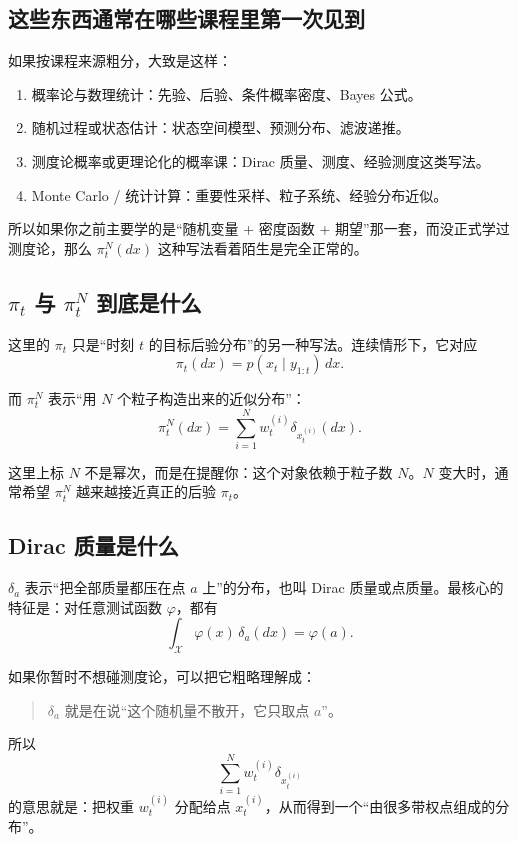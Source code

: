 \documentclass[12pt,a4paper]{ctexart}
\begin{document}
\subsection{这些东西通常在哪些课程里第一次见到}

如果按课程来源粗分，大致是这样：
\begin{enumerate}
  \item 概率论与数理统计：先验、后验、条件概率密度、Bayes 公式。
  \item 随机过程或状态估计：状态空间模型、预测分布、滤波递推。
  \item 测度论概率或更理论化的概率课：Dirac 质量、测度、经验测度这类写法。
  \item Monte Carlo / 统计计算：重要性采样、粒子系统、经验分布近似。
\end{enumerate}

所以如果你之前主要学的是“随机变量 + 密度函数 + 期望”那一套，而没正式学过测度论，那么 \(\pi_t^N(dx)\) 这种写法看着陌生是完全正常的。

\subsection{\(\pi_t\) 与 \(\pi_t^N\) 到底是什么}

这里的 \(\pi_t\) 只是“时刻 \(t\) 的目标后验分布”的另一种写法。连续情形下，它对应
\[
\pi_t(dx) = p(x_t \mid y_{1:t})\,dx.
\]

而 \(\pi_t^N\) 表示“用 \(N\) 个粒子构造出来的近似分布”：
\[
\pi_t^N(dx)
= \sum_{i=1}^N w_t^{(i)} \delta_{x_t^{(i)}}(dx).
\]

这里上标 \(N\) 不是幂次，而是在提醒你：这个对象依赖于粒子数 \(N\)。\(N\) 变大时，通常希望 \(\pi_t^N\) 越来越接近真正的后验 \(\pi_t\)。

\subsection{Dirac 质量是什么}

\(\delta_a\) 表示“把全部质量都压在点 \(a\) 上”的分布，也叫 Dirac 质量或点质量。最核心的特征是：对任意测试函数 \(\varphi\)，都有
\[
\int_{\mathcal X} \varphi(x)\,\delta_a(dx) = \varphi(a).
\]

如果你暂时不想碰测度论，可以把它粗略理解成：
\begin{quote}
\(\delta_a\) 就是在说“这个随机量不散开，它只取点 \(a\)”。
\end{quote}

所以
\[
\sum_{i=1}^N w_t^{(i)} \delta_{x_t^{(i)}}
\]
的意思就是：把权重 \(w_t^{(i)}\) 分配给点 \(x_t^{(i)}\)，从而得到一个“由很多带权点组成的分布”。
\end{document}
